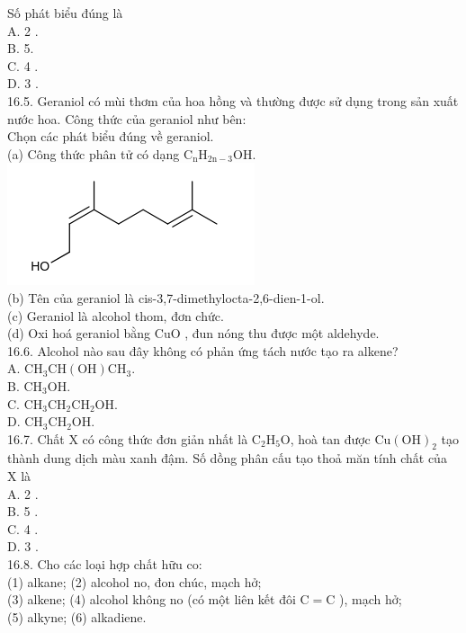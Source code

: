 \documentclass[10pt]{article}
\begin{document}
Số phát biểu đúng là\\
A. 2 .\\
B. 5.\\
C. 4 .\\
D. 3 .\\
16.5. Geraniol có mùi thơm của hoa hồng và thường được sử dụng trong sản xuất nước hoa. Công thức của geraniol như bên:\\
Chọn các phát biểu đúng về geraniol.\\
(a) Công thức phân tử có dạng $\mathrm{C}_{\mathrm{n}} \mathrm{H}_{2 \mathrm{n}-3} \mathrm{OH}$.\\
\includegraphics{smile-616d6cb3e52014ac25776ae56e6e5d790ffa85e0}\\
(b) Tên của geraniol là cis-3,7-dimethylocta-2,6-dien-1-ol.\\
(c) Geraniol là alcohol thom, đơn chức.\\
(d) Oxi hoá geraniol bằng CuO , đun nóng thu được một aldehyde.\\
16.6. Alcohol nào sau đây không có phản ứng tách nước tạo ra alkene?\\
A. $\mathrm{CH}_{3} \mathrm{CH}(\mathrm{OH}) \mathrm{CH}_{3}$.\\
B. $\mathrm{CH}_{3} \mathrm{OH}$.\\
C. $\mathrm{CH}_{3} \mathrm{CH}_{2} \mathrm{CH}_{2} \mathrm{OH}$.\\
D. $\mathrm{CH}_{3} \mathrm{CH}_{2} \mathrm{OH}$.\\
16.7. Chất X có công thức đơn giản nhất là $\mathrm{C}_{2} \mathrm{H}_{5} \mathrm{O}$, hoà tan được $\mathrm{Cu}(\mathrm{OH})_{2}$ tạo thành dung dịch màu xanh đậm. Số dồng phân cấu tạo thoả măn tính chất của X là\\
A. 2 .\\
B. 5 .\\
C. 4 .\\
D. 3 .\\
16.8. Cho các loại hợp chất hữu co:\\
(1) alkane; (2) alcohol no, đon chúc, mạch hở;\\
(3) alkene; (4) alcohol không no (có một liên kết đôi $\mathrm{C}=\mathrm{C}$ ), mạch hở;\\
(5) alkyne; (6) alkadiene.
\end{document}
